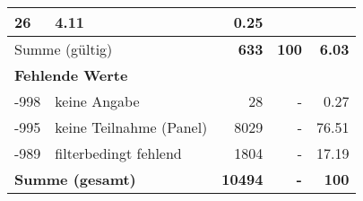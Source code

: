 \begin{longtable}{lXrrr}
       \num{26} &
       \num[round-mode=places,round-precision=2]{4.11} &
         \num[round-mode=places,round-precision=2]{0.25} \\
     \midrule
     \multicolumn{2}{l}{Summe (gültig)} &
       \textbf{\num{633}} &
     \textbf{\num{100}} &
       \textbf{\num[round-mode=places,round-precision=2]{6.03}} \\
     \multicolumn{5}{l}{\textbf{Fehlende Werte}}\\
       -998 &
       keine Angabe &
         \num{28} &
        - &
         \num[round-mode=places,round-precision=2]{0.27} \\
       -995 &
       keine Teilnahme (Panel) &
         \num{8029} &
        - &
         \num[round-mode=places,round-precision=2]{76.51} \\
       -989 &
       filterbedingt fehlend &
         \num{1804} &
        - &
         \num[round-mode=places,round-precision=2]{17.19} \\
     \midrule
     \multicolumn{2}{l}{\textbf{Summe (gesamt)}} &
          \textbf{\num{10494}} &
        \textbf{-} &
        \textbf{\num{100}} \\
     \bottomrule
     \end{longtable}
     
